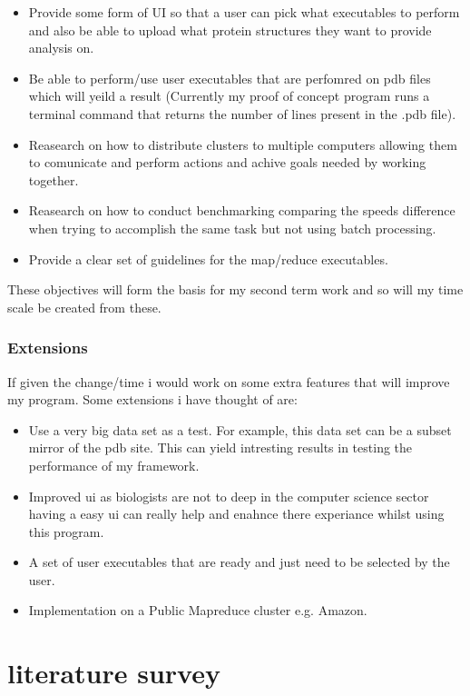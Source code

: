 \documentclass{report}
\begin{document}
\begin{itemize}
    \item Provide some form of UI so that a user can pick what executables to perform and also be able to upload what protein structures they want to provide analysis on.
    \item Be able to perform/use user executables that are perfomred on pdb files which will yeild a result (Currently my proof of concept program runs a terminal command that returns the number of lines present in the .pdb file).
    \item Reasearch on how to distribute clusters to multiple computers allowing them to comunicate and perform actions and achive goals needed by working together.
    \item Reasearch on how to conduct benchmarking comparing the speeds difference when trying to accomplish the same task but not using batch processing.
    \item Provide a clear set of guidelines for the map/reduce executables.
\end{itemize}

These objectives will form the basis for my second term work and so will my time scale be created from these.


\subsubsection{Extensions}

If given the change/time i would work on some extra features that will improve my program. Some extensions i have thought of are:

\begin{itemize}
    \item Use a very big data set as a test. For example, this data set can be a subset mirror of the pdb site. This can yield intresting results in testing the performance of my framework.
    \item Improved ui as biologists are not to deep in the computer science sector having a easy ui can really help and enahnce there experiance whilst using this program.
    \item A set of user executables that are ready and just need to be selected by the user.
    \item Implementation on a Public Mapreduce cluster e.g. Amazon.
\end{itemize}


\section*{literature survey}
\end{document}
